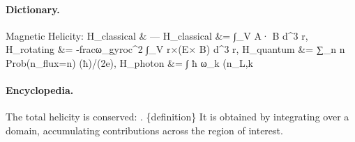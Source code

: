 \paragraph{Dictionary.}
Magnetic Helicity: H\_classical \& — H\_classical \&= ∫\_V A· B d\textasciicircum{}3 r, H\_rotating \&= -fracω\_gyroc\textasciicircum{}2 ∫\_V r×(E× B) d\textasciicircum{}3 r, H\_quantum \&= ∑\_n n Prob(n\_flux=n) (ħ)/(2e), H\_photon \&= ∫ ħ ω\_k (n\_L,k

\paragraph{Encyclopedia.}
The total helicity is conserved: . \{definition\} It is obtained by integrating over a domain, accumulating contributions across the region of interest.
